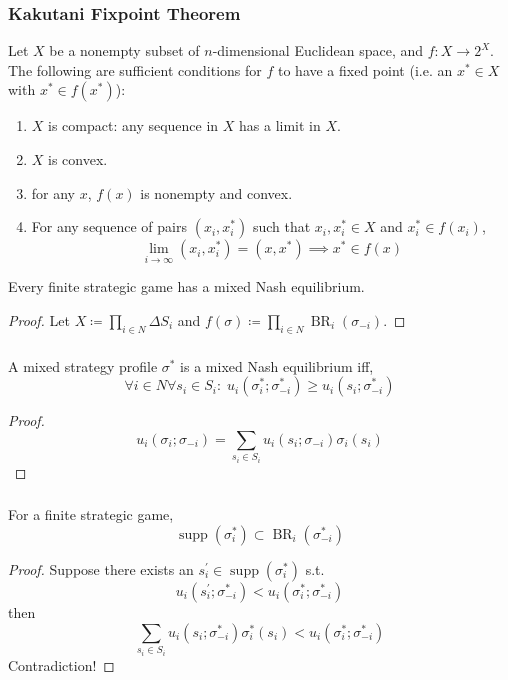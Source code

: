 \documentclass[UTF8,11pt,colorlinks,compress,openany]{beamer}%
\begin{document}
\begin{frame}\frametitle{Kakutani Fixpoint Theorem}
\setlength\abovedisplayskip{0pt}
\setlength\belowdisplayskip{0pt}
\begin{theorem}
Let $X$ be a nonempty subset of $n$-dimensional Euclidean space, and $f:X\to 2^X$. The following are sufficient conditions for $f$ to have a fixed point
(i.e. an $x^*\in X$ with $x^*\in f(x^*)$):
\begin{enumerate}
	\item $X$ is compact: any sequence in $X$ has a limit in $X$.
	\item $X$ is convex.
	\item for any $x$, $f(x)$ is nonempty and convex.
	\item For any sequence of pairs $(x_i,x_i^*)$ such that $x_i,x_i^*\in X$ and $x_i^*\in f(x_i)$,
	\[\lim_{i\to\infty}(x_i,x_i^*)=(x,x^*)\implies x^*\in f(x)\]
\end{enumerate}
\end{theorem}
\begin{theorem}
Every finite strategic game has a mixed Nash equilibrium.
\end{theorem}
\begin{proof}
Let $X\coloneqq\prod_{i\in N}\Delta S_i$ and $f(\sigma)\coloneqq\prod_{i\in N} \operatorname{BR}_i(\sigma_{-i})$.
\end{proof}
\end{frame}

\begin{frame}\frametitle{}
\begin{theorem}
	A mixed strategy profile $\sigma^*$ is a mixed Nash equilibrium iff,
	\[\forall i\in N\forall s_i\in S_i:\; u_i(\sigma_i^*;\sigma_{-i}^*)\geq u_i(s_i;\sigma_{-i}^*)\]
\end{theorem}
\begin{proof}
	\[u_i(\sigma_i;\sigma_{-i})=\sum\limits_{s_i\in S_i}u_i(s_i;\sigma_{-i})\sigma_i(s_i)\]
\end{proof}
\end{frame}

\begin{frame}\frametitle{}
\begin{theorem}
	For a finite strategic game,
	\[\operatorname{supp}(\sigma_i^*)\subset \operatorname{BR}_i(\sigma_{-i}^*)\]
\end{theorem}
\begin{proof}
	Suppose there exists an $s_i^\prime\in \operatorname{supp}(\sigma_i^*)$ s.t. \[u_i(s_i^\prime;\sigma_{-i}^*)<u_i(\sigma_i^*;\sigma_{-i}^*)\]
	then \[\sum\limits_{s_i\in S_i}u_i(s_i;\sigma_{-i}^*)\sigma_i^*(s_i)<u_i(\sigma_i^*;\sigma_{-i}^*)\]
	Contradiction!
\end{proof}
\end{frame}
\end{document}
